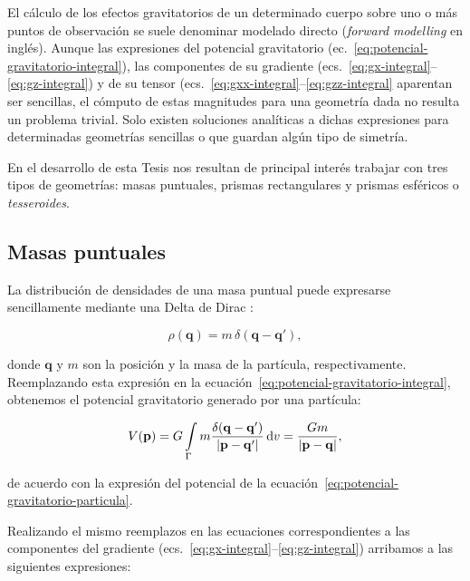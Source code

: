 El cálculo de los efectos gravitatorios de un determinado cuerpo sobre uno
o más puntos de observación se suele denominar modelado directo (\emph{forward
modelling} en inglés).
Aunque las expresiones del potencial gravitatorio
(ec.~\ref{eq:potencial-gravitatorio-integral}),
las componentes de su gradiente
(ecs.~\ref{eq:gx-integral}--\ref{eq:gz-integral})
y de su tensor (ecs.~\ref{eq:gxx-integral}--\ref{eq:gzz-integral}
aparentan ser sencillas, el cómputo de estas magnitudes para una geometría dada
no resulta un problema trivial.
Solo existen soluciones analíticas a dichas expresiones para determinadas
geometrías sencillas o que guardan algún tipo de simetría.

En el desarrollo de esta Tesis nos resultan de principal interés trabajar con
tres tipos de geometrías: masas puntuales, prismas rectangulares y prismas
esféricos o \emph{tesseroides}.

\subsection{Masas puntuales}

La distribución de densidades de una masa puntual puede expresarse
sencillamente mediante una Delta de Dirac \citep{vladimirov1979}:

\begin{equation}
    \rho(\mathbf{q}) = m \, \delta(\mathbf{q} - \mathbf{q'}),
\end{equation}

\noindent donde $\mathbf{q}$ y $m$ son la posición y la masa de la partícula,
respectivamente.
Reemplazando esta expresión en la
ecuación~\ref{eq:potencial-gravitatorio-integral}, obtenemos el potencial
gravitatorio generado por una partícula:

\begin{equation}
    V(\mathbf{p}) =
        G \int\limits_\Gamma
        m \frac{\delta(\mathbf{q} - \mathbf{q'})}{|\mathbf{p} - \mathbf{q'}|}
        \mathop{}\!\textnormal{d} v =
        \frac{G m}{|\mathbf{p} - \mathbf{q}|},
    \label{eq:potencial-masa-puntual}
\end{equation}

\noindent de acuerdo con la expresión del potencial de la
ecuación~\ref{eq:potencial-gravitatorio-particula}.

Realizando el mismo reemplazos en las ecuaciones correspondientes a las
componentes del gradiente (ecs.~\ref{eq:gx-integral}--\ref{eq:gz-integral})
arribamos a las siguientes expresiones:


